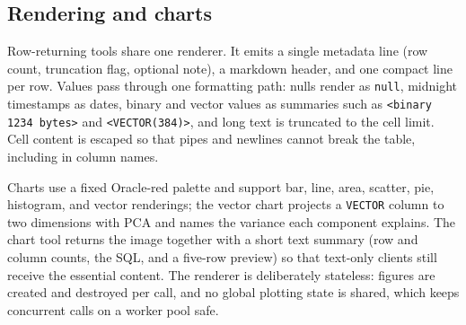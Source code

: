 \subsection{Rendering and charts}

Row-returning tools share one renderer. It emits a single metadata line (row count, truncation flag, optional note), a markdown header, and one compact line per row. Values pass through one formatting path: nulls render as \texttt{null}, midnight timestamps as dates, binary and vector values as summaries such as \texttt{<binary 1234 bytes>} and \texttt{<VECTOR(384)>}, and long text is truncated to the cell limit. Cell content is escaped so that pipes and newlines cannot break the table, including in column names.

Charts use a fixed Oracle-red palette and support bar, line, area, scatter, pie, histogram, and vector renderings; the vector chart projects a \texttt{VECTOR} column to two dimensions with PCA and names the variance each component explains. The chart tool returns the image together with a short text summary (row and column counts, the SQL, and a five-row preview) so that text-only clients still receive the essential content. The renderer is deliberately stateless: figures are created and destroyed per call, and no global plotting state is shared, which keeps concurrent calls on a worker pool safe.
